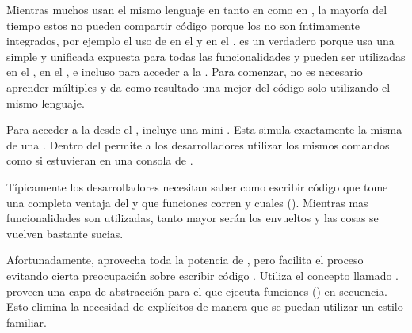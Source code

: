 Mientras muchos \frameworks usan el mismo lenguaje en tanto en \client como en \server, la mayoría del tiempo estos no pueden compartir código porque los \frameworks no son íntimamente integrados, por ejemplo el uso de \angularjs en el \frontend y \expressjs en el \backend. \meteor es un \fullstack verdadero porque usa una simple y unificada \api expuesta para todas las funcionalidades \core y pueden ser utilizadas en el \server, en el \browser, e incluso para acceder a la \dataBase. Para comenzar, no es necesario aprender múltiples \frameworks y da como resultado una mejor \reusability del código solo utilizando el mismo lenguaje.

Para acceder a la \dataBase desde el \browser, \meteor incluye una mini \dataBase. Esta simula exactamente la misma \api de una \dataBase. Dentro del \browser \minimongo permite a los desarrolladores utilizar los mismos comandos como si estuvieran en una consola de \mongodb.

Típicamente los desarrolladores necesitan saber como escribir código que tome una completa ventaja del \eventloop y que funciones corren \synchronously y cuales \asynchronously (). Mientras mas funcionalidades \asynchronously son utilizadas, tanto mayor serán los \callbacks envueltos y las cosas se vuelven bastante sucias.

Afortunadamente, \meteor aprovecha toda la potencia de \eventloop, pero facilita el proceso evitando cierta preocupación sobre escribir código \asynchronous. Utiliza el concepto llamado \fibers \behindthescenes. \fibers proveen una capa de abstracción para el \eventloop que ejecuta funciones \asynchronous(\tasks) en secuencia. Esto elimina la necesidad de \callbacks explícitos de manera que se puedan utilizar un estilo \synchronous familiar.

